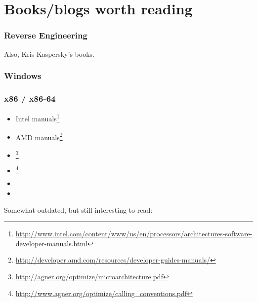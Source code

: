 \chapter{Books/blogs worth reading}


\subsection{Reverse Engineering}



Also, Kris Kaspersky's books.

\subsection{Windows}



\subsection{\CCpp}



\subsection{x86 / x86-64}

\label{x86_manuals}
\begin{itemize}
\item Intel manuals\footnote{\AlsoAvailableAs \url{http://www.intel.com/content/www/us/en/processors/architectures-software-developer-manuals.html}}

\item AMD manuals\footnote{\AlsoAvailableAs \url{http://developer.amd.com/resources/developer-guides-manuals/}}

\item \AgnerFog{}\footnote{\AlsoAvailableAs \url{http://agner.org/optimize/microarchitecture.pdf}}

\item \AgnerFogCC{}\footnote{\AlsoAvailableAs \url{http://www.agner.org/optimize/calling_conventions.pdf}}

\item \IntelOptimization

\item \AMDOptimization
\end{itemize}

Somewhat outdated, but still interesting to read:

